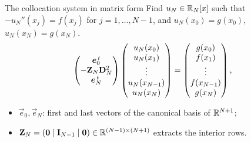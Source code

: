 \begin{frame}{The collocation system in matrix form}
    Find $u_N \in {\mathbb R}_N[x]$ such that $-u_N''(x_j) = f(x_j)$ for $j = 1, \dots, N-1$, and $u_N(x_0) = g(x_0)$, $u_N(x_N) = g(x_N)$.
    \[
        \begin{pmatrix}
            \bm{e}_0^{\,t}       \\
            -\mathbf{Z}_N \mathbf{D}_N^2 \\
            \bm{e}_N^{\,t}
        \end{pmatrix}
        \begin{pmatrix}
            u_N(x_0) \\ u_N(x_1) \\ \vdots \\ u_N(x_{N-1}) \\ u_N(x_N)
        \end{pmatrix}
        =
        \begin{pmatrix}
            g(x_0) \\ f(x_1) \\ \vdots \\ f(x_{N-1}) \\ g(x_N)
        \end{pmatrix},
    \]
    \begin{itemize}
        \item $\vec e_0, \vec e_N$: first and last vectors of the canonical basis of ${\mathbb R}^{N+1}$;
        \item $\mathbf{Z}_N = (\bm{0} \mid \mathbf{I}_{N-1} \mid \bm{0}) \in {\mathbb R}^{(N-1)\times(N+1)}$ extracts the interior rows.
    \end{itemize}
\end{frame}


